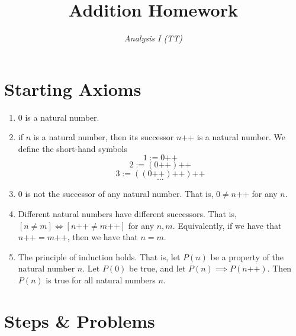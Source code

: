 \documentclass[12pt]{article}
\title{\vspace{-1cm}\textbf{Addition Homework}}
\author{\textit{Analysis I (TT)}}
\begin{document}
\maketitle
\vspace{-1em}

\newenvironment{justifiedproof}{%
  \begin{tabular}{@{}p{0.6\linewidth}@{\quad}p{0.12\linewidth}@{}}%
}{\end{tabular}}

\section{Starting Axioms}
\begin{enumerate}
	\item $0$ is a natural number.
	\item if $n$ is a natural number, then its successor $n$++ is a natural number. We define the short-hand symbols
	$$1 := 0\text{++}$$
	$$2 := (0\text{++})\text{++}$$
	$$3 := ((0\text{++})\text{++})\text{++}$$
	$$\hdots$$
	\item $0$ is not the successor of any natural number. That is, $0 \neq n\text{++}$ for any $n$.
	\item Different natural numbers have different successors. That is, $[n \neq m] \iff [n\text{++} \neq m\text{++}]$ for any $n,m$. Equivalently, if we have that $n\text{++} = m\text{++}$, then we have that $n=m$.
	\item The principle of induction holds. That is, let $P(n)$ be a property of the natural number $n$. Let $P(0)$ be true, and let $P(n) \implies P(n\text{++})$. Then $P(n)$ is true for all natural numbers $n$.
 \end{enumerate}


\section{Steps \& Problems}
\end{document}
